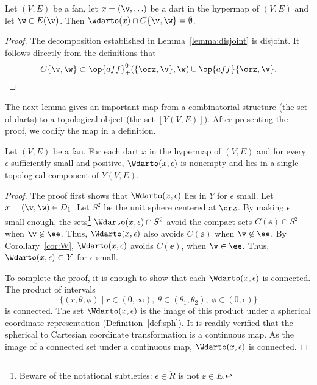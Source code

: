 \begin{corollary}[disjointness]\label{cor:W}
  Let $(V,E)$ be a fan, let $x = (\v,\ldots)$ be a dart in the
  hypermap of $(V,E)$ and let $\w\in E(\v)$.  Then $\Wdarto(x)\cap
  C\{\v,\w\}=\emptyset$.
\end{corollary}

\begin{proof} The decomposition established in
  Lemma~\ref{lemma:disjoint} is disjoint.  It follows directly from
  the definitions that
\[ C\{\v,\w\}\subset \op{aff}_+^0(\{\orz,\v\},\w) \cup 
\op{aff}\{\orz,\v\}.\] 
\end{proof}

The next lemma gives an important map from a combinatorial structure (the
set of darts) to a topological object  (the set $[Y(V,E)]$).  After presenting the
proof, we  codify the map in a definition.

\begin{lemma} 
Let $(V,E)$ be a fan.
For each dart $x$ in the hypermap of $(V,E)$
and for every $\epsilon$ sufficiently small and positive,
$\Wdarto(x,\epsilon)$ is nonempty and lies in a single 
topological component of $Y(V,E)$.
\end{lemma}
%
%

\begin{proof} The proof first shows that $\Wdarto(x,\epsilon)$ lies in
  $Y$ for $\epsilon$ small.  Let $x=(\v,\w)\in D_1$.  Let $S^2$ be
  the unit sphere centered at $\orz$.  By making $\epsilon$ small
  enough, the sets\footnote{Beware of the notational subtleties:
    $\epsilon\in\ring{R}$ is not $\ee\in E$.}  $\Wdarto(x,\epsilon)\cap
  S^2$ avoid the compact sets $C(\ee)\cap S^2$ when $\v\not\in \ee$.
  Thus, $\Wdarto(x,\epsilon)$ also avoids $C(\ee)$ when $\v\not\in
  \ee$.  By Corollary~\ref{cor:W}, $\Wdarto(x,\epsilon)$ avoids
  $C(\ee)$, when $\v\in \ee$.  Thus, $\Wdarto(x,\epsilon)\subset Y$ for $\epsilon$ small.

To complete the proof, it is enough to show that each
$\Wdarto(x,\epsilon)$ is connected.  The product of intervals
\[ 
\{(r,\theta,\phi) \mid r\in (0,\infty),
~\theta\in (\theta_1,\theta_2),~\phi\in (0,\epsilon)\}
\] 
is connected.  The set $\Wdarto(x,\epsilon)$ is the image of this
product under a spherical coordinate representation
(Definition~\ref{def:sph}).  
It is readily verified that the spherical to Cartesian coordinate
transformation is a continuous map. As the image of a connected set
under a continuous map, $\Wdarto(x,\epsilon)$ is connected.
\end{proof}
%
%
%




